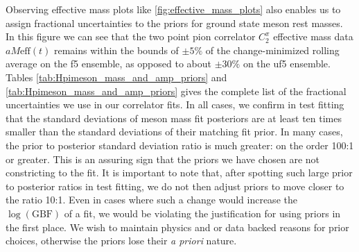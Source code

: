 Observing effective mass plots like \ref{fig:effective_mass_plots} also enables us to assign fractional uncertainties to the priors for ground state meson rest masses.  In this figure we can see that the two point pion correlator $C^\pi_2$ effective mass data $aM\mathrm{eff}(t)$ remains within the bounds of $\pm5\%$ of the change-minimized rolling average on the f5 ensemble, as opposed to about $\pm30\%$ on the uf5 ensemble. Tables \ref{tab:Hpimeson_mass_and_amp_priors} and \ref{tab:Hpimeson_mass_and_amp_priors} gives the complete list of the fractional uncertainties we use in our correlator fits.  In all cases, we confirm in test fitting that the standard deviations of meson mass fit posteriors are at least ten times smaller than the standard deviations of their matching fit prior.  In many cases, the prior to posterior standard deviation ratio is much greater: on the order 100:1 or greater.  This is an assuring sign that the priors we have chosen are not constricting to the fit.  It is important to note that, after spotting such large prior to posterior ratios in test fitting, we do not then adjust priors to move closer to the ratio 10:1.  Even in cases where such a change would increase the $\log(\mathrm{GBF})$ of a fit, we would be violating the justification for using priors in the first place.  We wish to maintain physics and or data backed reasons for prior choices, otherwise the priors lose their \textit{a priori} nature.

 
